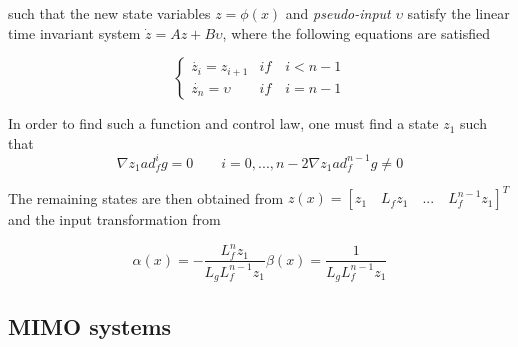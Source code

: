 such that the new state variables $z=\phi(x)$ and \emph{pseudo-input} $\upsilon$ satisfy the linear time invariant system $\dot{z} = Az+B\upsilon$, where the following equations are satisfied

\begin{equation}
	\begin{cases}
		\dot{z_i}=z_{i+1} & if\quad i<n-1\\
		\dot{z_n}=\upsilon & if\quad i=n-1
	\end{cases}
	\label{eq:SISO_state}
\end{equation}

In order to find such a function and control law, one must find a state $z_1$ such that 
\begin{subequations}
	\begin{equation}
		\nabla z_1 ad_f^ig=0 \qquad i=0, ..., n-2
	\end{equation}
	\begin{equation}
		\nabla z_1 ad_f^{n-1}g\neq 0
	\end{equation}
\end{subequations}

The remaining states are then obtained from $z(x) = [z_1 \quad L_fz_1 \quad ... \quad L_f^{n-1}z_1]^T$ and the input transformation from

\begin{subequations}
	\begin{equation}
		\alpha (x) = - \dfrac{L_f^nz_1}{L_gL_f^{n-1}z_1}
	\end{equation}
	\begin{equation}
		\beta (x) = \dfrac{1}{L_gL_f^{n-1}z_1}
	\end{equation}
\end{subequations}

\subsection{MIMO systems}
\label{section:background/MIMO_NLI}


